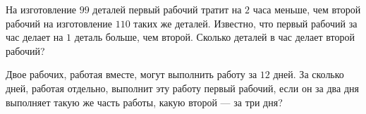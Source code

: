 \begin{class}[number=6]
\begin{listofex}
		\item На изготовление \( 99 \) деталей первый рабочий тратит на \( 2 \) часа меньше, чем второй рабочий на изготовление \( 110 \) таких же деталей. Известно, что первый рабочий за час делает на \( 1 \) деталь больше, чем второй. Сколько деталей в час делает второй рабочий?
		\item Двое рабочих, работая вместе, могут выполнить работу за \( 12 \) дней. За сколько дней, работая отдельно, выполнит эту работу первый рабочий, если он за два дня выполняет такую же часть работы, какую второй --- за три дня?
	\end{listofex}
\end{class}
%
%
%
%
%
%
%
%
